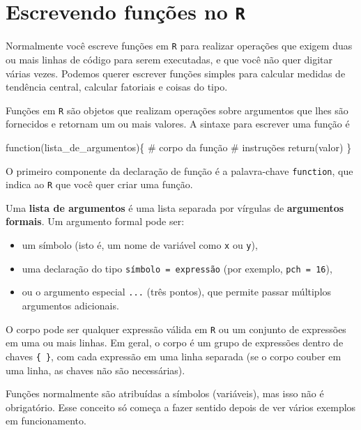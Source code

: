 \documentclass[
  letterpaper,
  DIV=11,
  numbers=noendperiod]{scrreprt}
\newenvironment{Shaded}{\begin{snugshade}}{\end{snugshade}}
\newcommand{\CommentTok}[1]{\textcolor[rgb]{0.37,0.37,0.37}{#1}}
\newcommand{\ControlFlowTok}[1]{\textcolor[rgb]{0.00,0.23,0.31}{#1}}
\newcommand{\FunctionTok}[1]{\textcolor[rgb]{0.28,0.35,0.67}{#1}}
\newcommand{\NormalTok}[1]{\textcolor[rgb]{0.00,0.23,0.31}{#1}}
\begin{document}
\section{\texorpdfstring{Escrevendo funções no
\texttt{R}}{Escrevendo funções no R}}\label{escrevendo-funuxe7uxf5es-no-r}

Normalmente você escreve funções em \texttt{R} para realizar operações
que exigem duas ou mais linhas de código para serem executadas, e que
você não quer digitar várias vezes. Podemos querer escrever funções
simples para calcular medidas de tendência central, calcular fatoriais e
coisas do tipo.

Funções em \texttt{R} são objetos que realizam operações sobre
argumentos que lhes são fornecidos e retornam um ou mais valores. A
sintaxe para escrever uma função é

\begin{Shaded}
\begin{Highlighting}[]
\ControlFlowTok{function}\NormalTok{(lista\_de\_argumentos)\{}
  \CommentTok{\# corpo da função}
  \CommentTok{\# instruções}
  \FunctionTok{return}\NormalTok{(valor)}
\NormalTok{\}}
\end{Highlighting}
\end{Shaded}

O primeiro componente da declaração de função é a palavra-chave
\texttt{function}, que indica ao \texttt{R} que você quer criar uma
função.

Uma \textbf{lista de argumentos} é uma lista separada por vírgulas de
\textbf{argumentos formais}. Um argumento formal pode ser:

\begin{itemize}
\item
  um símbolo (isto é, um nome de variável como \texttt{x} ou
  \texttt{y}),
\item
  uma declaração do tipo \texttt{símbolo\ =\ expressão} (por exemplo,
  \texttt{pch\ =\ 16}),
\item
  ou o argumento especial \texttt{...} (três pontos), que permite passar
  múltiplos argumentos adicionais.
\end{itemize}

O corpo pode ser qualquer expressão válida em \texttt{R} ou um conjunto
de expressões em uma ou mais linhas. Em geral, o corpo é um grupo de
expressões dentro de chaves \texttt{\{\ \}}, com cada expressão em uma
linha separada (se o corpo couber em uma linha, as chaves não são
necessárias).

Funções normalmente são atribuídas a símbolos (variáveis), mas isso não
é obrigatório. Esse conceito só começa a fazer sentido depois de ver
vários exemplos em funcionamento.
\end{document}
